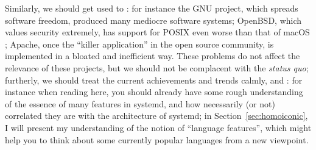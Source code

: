 Similarly, we should get used to : for instance the GNU project, which spreads software freedom,
produced many mediocre software systems; OpenBSD, which
values security extremely, has support for POSIX even worse than that of macOS%
; Apache, once the ``killer application'' in the open
source community, is implemented in a bloated and inefficient way.  These
problems do not affect the relevance of these projects, but we should not be
complacent with the \emph{status quo}; furtherly, we should treat the current
achievements and trends calmly, and : for instance when reading here, you should already have some
rough understanding of the essence of many features in systemd, and how
necessarily (or not) correlated they are with the architecture of systemd;
in Section~\ref{sec:homoiconic}, I will present my understanding of
the notion of ``language features'', which might help you to think
about some currently popular languages from a new viewpoint.

